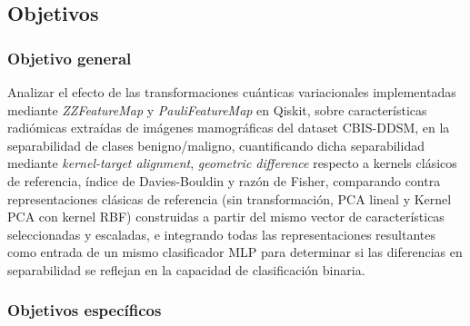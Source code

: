 
\subsection{Objetivos}
\label{sec:objetivos}

\subsubsection{Objetivo general}

Analizar el efecto de las transformaciones cuánticas variacionales implementadas mediante
\textit{ZZFeatureMap} y \textit{PauliFeatureMap} en Qiskit, sobre características radiómicas
extraídas de imágenes mamográficas del dataset CBIS-DDSM, en la separabilidad de clases
benigno/maligno, cuantificando dicha separabilidad mediante \textit{kernel-target alignment},
\textit{geometric difference} respecto a kernels clásicos de referencia, índice de Davies-Bouldin y
razón de Fisher, comparando contra representaciones clásicas de referencia (sin transformación, PCA
lineal y Kernel PCA con kernel RBF) construidas a partir del mismo vector de características
seleccionadas y escaladas, e integrando todas las representaciones resultantes como entrada de un
mismo clasificador MLP para determinar si las diferencias en separabilidad se reflejan en la
capacidad de clasificación binaria.

\subsubsection{Objetivos específicos}

